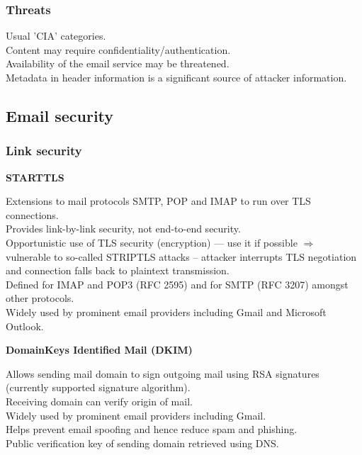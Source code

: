 \documentclass{article}
\begin{document}
\subsubsection{Threats}

Usual 'CIA' categories.\\
Content may require confidentiality/authentication.\\
Availability of the email service may be threatened.\\
Metadata in header information is a significant source of attacker information.

\subsection{Email security}

\subsubsection{Link security}

\textbf{STARTTLS}

Extensions to mail protocols SMTP, POP and IMAP to run over TLS connections.\\
Provides link-by-link security, not end-to-end security.\\
Opportunistic use of TLS security (encryption) — use it if possible $\Rightarrow$ vulnerable to so-called STRIPTLS attacks – attacker interrupts TLS negotiation and connection falls back to plaintext transmission.\\
Defined for IMAP and POP3 (RFC 2595) and for SMTP (RFC 3207) amongst other protocols.\\
Widely used by prominent email providers including Gmail and Microsoft Outlook.

\textbf{DomainKeys Identified Mail (DKIM)}

Allows sending mail domain to sign outgoing mail using RSA signatures (currently supported signature algorithm).\\
Receiving domain can verify origin of mail.\\
Widely used by prominent email providers including Gmail.\\
Helps prevent email spoofing and hence reduce spam and phishing.\\
Public verification key of sending domain retrieved using DNS.
\end{document}
